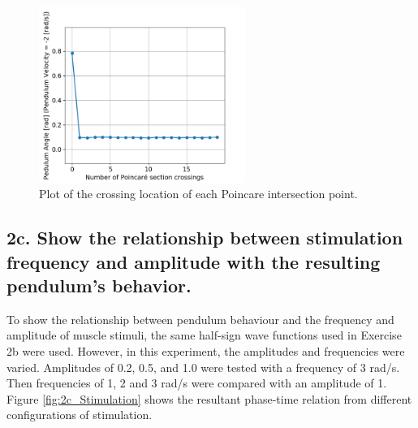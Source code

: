 \documentclass{cmc}
\begin{document}
\begin{figure}[H]
    \centering
    \includegraphics[width=0.6\textwidth]{2b/2b_pc_cross.png}
    \caption{Plot of the crossing location of each Poincare intersection point.}
    \label{fig:2bint}
\end{figure}

  
\label{sec:2c}
\subsection*{2c. Show the relationship between stimulation frequency and amplitude with the resulting pendulum's behavior.}

To show the relationship between pendulum behaviour and the frequency and amplitude of muscle stimuli, the same half-sign wave functions used in Exercise 2b were used. However, in this experiment, the amplitudes and frequencies were varied. Amplitudes of 0.2, 0.5, and 1.0 were tested with a frequency of 3 rad/s. Then frequencies of 1, 2 and 3 rad/s were compared with an amplitude of 1. Figure \ref{fig:2c_Stimulation} shows the resultant phase-time relation from different configurations of stimulation. 
\end{document}
